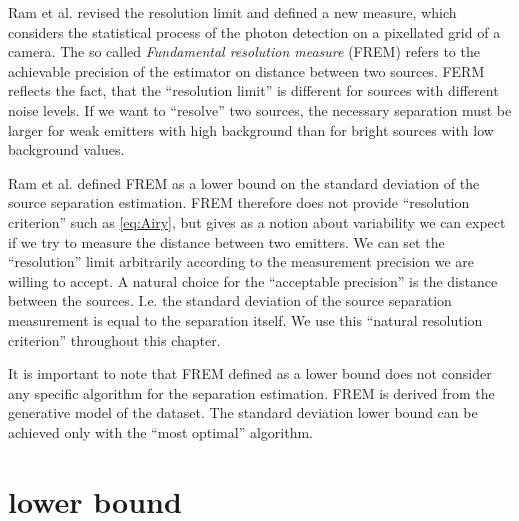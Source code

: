 Ram et al. \cite{Ram2006,Ram2006b} revised the resolution limit and defined a new measure, which considers the statistical process of the photon detection on a pixellated grid of a camera. The so called \emph{Fundamental resolution measure} (FREM) refers to the achievable precision of the estimator on distance between two sources. FERM reflects the fact, that the ``resolution limit'' is different for sources with different noise levels. If we want to ``resolve'' two sources, the necessary separation must be larger for weak emitters with high background than for bright sources with low background values.

Ram et al. defined FREM as a \CR lower bound on the standard deviation of the source separation estimation. FREM therefore does not provide ``resolution criterion'' such as \autoref{eq:Airy}, but gives as a notion about variability we can expect if we try to measure the distance between two emitters. We can set the ``resolution'' limit arbitrarily according to the measurement precision we are willing to accept. A natural choice for the ``acceptable precision'' is the distance between the sources. I.e. the standard deviation of the source separation measurement is equal to the separation itself. We use this ``natural resolution criterion'' throughout this chapter. 

It is important to note that FREM defined as a \CR lower bound does not consider any specific algorithm for the separation estimation. FREM is derived from the generative model of the dataset.  The standard deviation lower bound can be achieved only with the ``most optimal'' algorithm. 




\section{\CR lower bound\label{sec:CR}}

